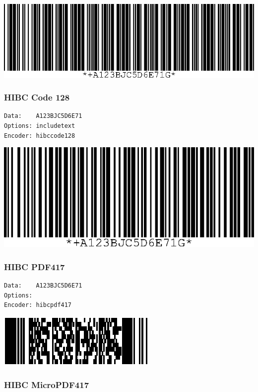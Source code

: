 \includegraphics{images/hibccode39-1.eps}

\hypertarget{hibc-code-128}{%
\subsubsection{HIBC Code 128}\label{hibc-code-128}}

\begin{verbatim}
Data:    A123BJC5D6E71
Options: includetext
Encoder: hibccode128
\end{verbatim}

\includegraphics{images/hibccode128-1.eps}

\hypertarget{hibc-pdf417}{%
\subsubsection{HIBC PDF417}\label{hibc-pdf417}}

\begin{verbatim}
Data:    A123BJC5D6E71
Options: 
Encoder: hibcpdf417
\end{verbatim}

\includegraphics{images/hibcpdf417-1.eps}

\hypertarget{hibc-micropdf417}{%
\subsubsection{HIBC MicroPDF417}\label{hibc-micropdf417}}

